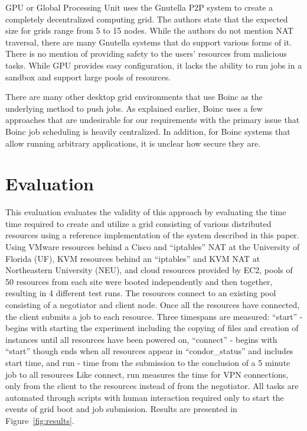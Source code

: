 GPU or Global Processing Unit uses the Gnutella P2P system to create a
completely decentralized computing grid.  The authors state that the expected
size for grids range from 5 to 15 nodes.  While the authors do not mention NAT
traversal, there are many Gnutella systems that do support various forms of it.
There is no mention of providing safety to the users' resources from malicious
tasks.  While GPU provides easy configuration, it lacks the ability to run
jobs in a sandbox and support large pools of resources.

There are many other desktop grid environments that use Boinc as the underlying
method to push jobs.  As explained earlier, Boinc uses a few approaches that
are undesirable for our requirements with the primary issue that Boinc job
scheduling is heavily centralized.  In addition, for Boinc systems that allow
running arbitrary applications, it is unclear how secure they are.

\section{Evaluation}
\label{evaluation}
This evaluation evaluates the validity of this approach by evaluating the time
time required to create and utilize a grid consisting of various distributed
resources using a reference implementation of the system described in this
paper.  Using VMware resources behind a Cisco and ``iptables'' NAT at the
University of Florida (UF), KVM resources behind an ``iptables'' and KVM NAT at
Northeastern University (NEU), and cloud resources provided by EC2, pools of 50
resources from each site were booted independently and then together, resulting
in 4 different test runs.  The resources connect to an existing pool consisting
of a negotiator and client node.  Once all the resources have connected, the
client submits a job to each resource.  Three timespans are measured: ``start''
- begins with starting the experiment including the copying of files and
creation of instances until all resources have been powered on, ``connect'' -
begins with ``start'' though ends when all resources appear in
``condor\_status'' and includes start time, and run - time from the submission
to the conclusion of a 5 minute job to all resources Like connect, run measures
the time for VPN connections, only from the client to the resources instead of
from the negotiator.  All tasks are automated through scripts with human
interaction required only to start the events of grid boot and job submission.
Results are presented in Figure~\ref{fig:results}.

